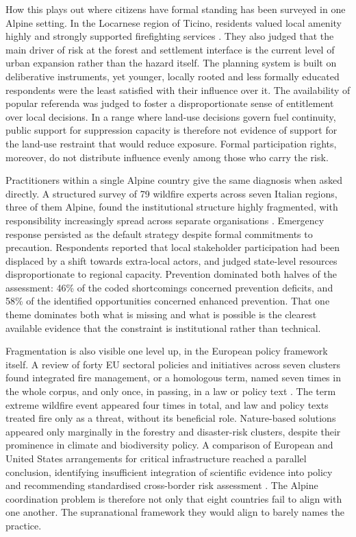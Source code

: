 \documentclass[11pt,a4paper]{article}
\begin{document}
How this plays out where citizens have formal standing has been surveyed in one Alpine setting. In the Locarnese region of Ticino, residents valued local amenity highly and strongly supported firefighting services \citep{bardsley_wildfire_2021}. They also judged that the main driver of risk at the forest and settlement interface is the current level of urban expansion rather than the hazard itself. The planning system is built on deliberative instruments, yet younger, locally rooted and less formally educated respondents were the least satisfied with their influence over it. The availability of popular referenda was judged to foster a disproportionate sense of entitlement over local decisions. In a range where land-use decisions govern fuel continuity, public support for suppression capacity is therefore not evidence of support for the land-use restraint that would reduce exposure. Formal participation rights, moreover, do not distribute influence evenly among those who carry the risk.

Practitioners within a single Alpine country give the same diagnosis when asked directly. A structured survey of 79 wildfire experts across seven Italian regions, three of them Alpine, found the institutional structure highly fragmented, with responsibility increasingly spread across separate organisations \citep{kirschner_governance_2024}. Emergency response persisted as the default strategy despite formal commitments to precaution. Respondents reported that local stakeholder participation had been displaced by a shift towards extra-local actors, and judged state-level resources disproportionate to regional capacity. Prevention dominated both halves of the assessment: 46\% of the coded shortcomings concerned prevention deficits, and 58\% of the identified opportunities concerned enhanced prevention. That one theme dominates both what is missing and what is possible is the clearest available evidence that the constraint is institutional rather than technical.

Fragmentation is also visible one level up, in the European policy framework itself. A review of forty EU sectoral policies and initiatives across seven clusters found integrated fire management, or a homologous term, named seven times in the whole corpus, and only once, in passing, in a law or policy text \citep{plana_framing_2024}. The term extreme wildfire event appeared four times in total, and law and policy texts treated fire only as a threat, without its beneficial role. Nature-based solutions appeared only marginally in the forestry and disaster-risk clusters, despite their prominence in climate and biodiversity policy. A comparison of European and United States arrangements for critical infrastructure reached a parallel conclusion, identifying insufficient integration of scientific evidence into policy and recommending standardised cross-border risk assessment \citep{kalapodis_towards_2025}. The Alpine coordination problem is therefore not only that eight countries fail to align with one another. The supranational framework they would align to barely names the practice.
\end{document}
